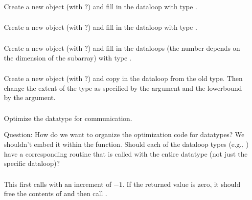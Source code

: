 \documentclass{article}
\begin{document}
\subsubsection{}
Create a new object (with ?) and fill in the dataloop
with type .

\subsubsection{}
Create a new object (with ?) and fill in the dataloop
with type .

\subsubsection{}
Create a new object (with ?) and fill in the
dataloops (the number depends on the dimension of the subarray) 
with type .

\subsubsection{}

\subsubsection{}
Create a new object (with ?) and copy in the
dataloop from the old type.  Then change the extent of the type as specified
by the  argument and the lowerbound by the  argument.

\subsubsection{}
Optimize the datatype for communication.  

Question:  How do we want to organize the optimization code for datatypes?  We
shouldn't embed it within the  function.  Should each of
the dataloop types (e.g., ) have a corresponding routine
that is called with the entire datatype (not just the specific dataloop)?

\subsubsection{}
This first calls  with an increment of $-1$.  If
the returned value is zero, it should free the contents of  and
then call .
\end{document}

